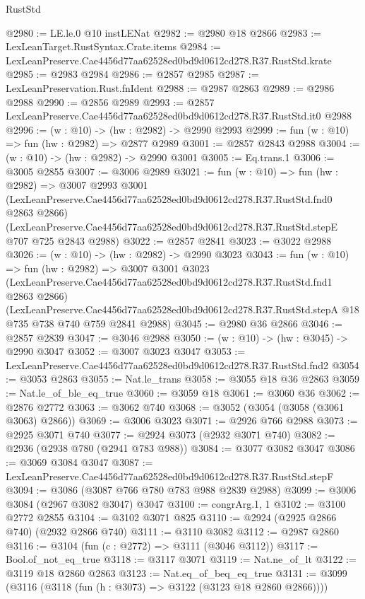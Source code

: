 \begin{lexlean}{RustStd}
\begin{coremodule}
@2980 := LE.le.{0} @10 instLENat
@2982 := @2980 @18 @2866
@2983 := LexLeanTarget.RustSyntax.Crate.items
@2984 := LexLeanPreserve.Cae4456d77aa62528ed0bd9d0612cd278.R37.RustStd.krate
@2985 := @2983 @2984
@2986 := @2857 @2985
@2987 := LexLeanPreservation.Rust.fnIdent
@2988 := @2987 @2863
@2989 := @2986 @2988
@2990 := @2856 @2989
@2993 := @2857 LexLeanPreserve.Cae4456d77aa62528ed0bd9d0612cd278.R37.RustStd.it0 @2988
@2996 := (w : @10) -> (hw : @2982) -> @2990 @2993
@2999 := fun (w : @10) => fun (hw : @2982) => @2877 @2989
@3001 := @2857 @2843 @2988
@3004 := (w : @10) -> (hw : @2982) -> @2990 @3001
@3005 := Eq.trans.{1}
@3006 := @3005 @2855
@3007 := @3006 @2989
@3021 := fun (w : @10) =>
  fun (hw : @2982) =>
  @3007
    @2993
    @3001
    (LexLeanPreserve.Cae4456d77aa62528ed0bd9d0612cd278.R37.RustStd.fnd0 @2863 @2866)
    (LexLeanPreserve.Cae4456d77aa62528ed0bd9d0612cd278.R37.RustStd.stepE @707 @725 @2843 @2988)
@3022 := @2857 @2841
@3023 := @3022 @2988
@3026 := (w : @10) -> (hw : @2982) -> @2990 @3023
@3043 := fun (w : @10) =>
  fun (hw : @2982) =>
  @3007
    @3001
    @3023
    (LexLeanPreserve.Cae4456d77aa62528ed0bd9d0612cd278.R37.RustStd.fnd1 @2863 @2866)
    (LexLeanPreserve.Cae4456d77aa62528ed0bd9d0612cd278.R37.RustStd.stepA
      @18
      @735
      @738
      @740
      @759
      @2841
      @2988)
@3045 := @2980 @36 @2866
@3046 := @2857 @2839
@3047 := @3046 @2988
@3050 := (w : @10) -> (hw : @3045) -> @2990 @3047
@3052 := @3007 @3023 @3047
@3053 := LexLeanPreserve.Cae4456d77aa62528ed0bd9d0612cd278.R37.RustStd.fnd2
@3054 := @3053 @2863
@3055 := Nat.le_trans
@3058 := @3055 @18 @36 @2863
@3059 := Nat.le_of_ble_eq_true
@3060 := @3059 @18
@3061 := @3060 @36
@3062 := @2876 @2772
@3063 := @3062 @740
@3068 := @3052 (@3054 (@3058 (@3061 @3063) @2866))
@3069 := @3006 @3023
@3071 := @2926 @766 @2988
@3073 := @2925 @3071 @740
@3077 := @2924 @3073 (@2932 @3071 @740)
@3082 := @2936 (@2938 @780 (@2941 @783 @988))
@3084 := @3077 @3082 @3047
@3086 := @3069 @3084 @3047
@3087 := LexLeanPreserve.Cae4456d77aa62528ed0bd9d0612cd278.R37.RustStd.stepF
@3094 := @3086 (@3087 @766 @780 @783 @988 @2839 @2988)
@3099 := @3006 @3084 (@2967 @3082 @3047) @3047
@3100 := congrArg.{1, 1}
@3102 := @3100 @2772 @2855
@3104 := @3102 @3071 @825
@3110 := @2924 (@2925 @2866 @740) (@2932 @2866 @740)
@3111 := @3110 @3082
@3112 := @2987 @2860
@3116 := @3104 (fun (c : @2772) => @3111 (@3046 @3112))
@3117 := Bool.of_not_eq_true
@3118 := @3117 @3071
@3119 := Nat.ne_of_lt
@3122 := @3119 @18 @2860 @2863
@3123 := Nat.eq_of_beq_eq_true
@3131 := @3099 (@3116 (@3118 (fun (h : @3073) => @3122 (@3123 @18 @2860 @2866))))

\end{coremodule}
\end{lexlean}
